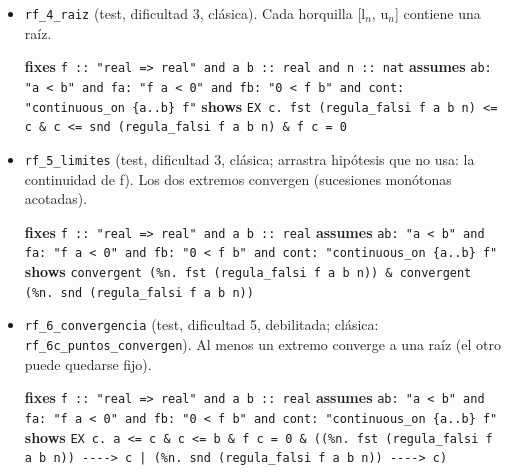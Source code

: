 \documentclass[11pt,a4paper]{article}
\begin{document}
\begin{itemize}
  \item \texttt{rf\_\allowbreak{}4\_\allowbreak{}raiz} (test, dificultad 3, clásica). Cada horquilla [l$_{n}$, u$_{n}$] contiene una raíz.\\
  {\footnotesize \textbf{fixes} \texttt{f :\allowbreak{}:\allowbreak{} "real =\allowbreak{}> real" and a b :\allowbreak{}:\allowbreak{} real and n :\allowbreak{}:\allowbreak{} nat} \textbf{assumes} \texttt{ab:\allowbreak{} "a < b" and fa:\allowbreak{} "f a < 0" and fb:\allowbreak{} "0 < f b" and cont:\allowbreak{} "continuous\_\allowbreak{}on \{a..b\} f"} \textbf{shows} \texttt{EX c. fst (\allowbreak{}regula\_\allowbreak{}falsi f a b n) <=\allowbreak{} c \&\allowbreak{} c <=\allowbreak{} snd (\allowbreak{}regula\_\allowbreak{}falsi f a b n) \&\allowbreak{} f c =\allowbreak{} 0}\par}
  \item \texttt{rf\_\allowbreak{}5\_\allowbreak{}limites} (test, dificultad 3, clásica; arrastra hipótesis que no usa: la continuidad de f). Los dos extremos convergen (sucesiones monótonas acotadas).\\
  {\footnotesize \textbf{fixes} \texttt{f :\allowbreak{}:\allowbreak{} "real =\allowbreak{}> real" and a b :\allowbreak{}:\allowbreak{} real} \textbf{assumes} \texttt{ab:\allowbreak{} "a < b" and fa:\allowbreak{} "f a < 0" and fb:\allowbreak{} "0 < f b" and cont:\allowbreak{} "continuous\_\allowbreak{}on \{a..b\} f"} \textbf{shows} \texttt{convergent (\allowbreak{}\%n. fst (\allowbreak{}regula\_\allowbreak{}falsi f a b n)) \&\allowbreak{} convergent (\allowbreak{}\%n. snd (\allowbreak{}regula\_\allowbreak{}falsi f a b n))}\par}
  \item \texttt{rf\_\allowbreak{}6\_\allowbreak{}convergencia} (test, dificultad 5, debilitada; clásica: \texttt{rf\_\allowbreak{}6c\_\allowbreak{}puntos\_\allowbreak{}convergen}). Al menos un extremo converge a una raíz (el otro puede quedarse fijo).\\
  {\footnotesize \textbf{fixes} \texttt{f :\allowbreak{}:\allowbreak{} "real =\allowbreak{}> real" and a b :\allowbreak{}:\allowbreak{} real} \textbf{assumes} \texttt{ab:\allowbreak{} "a < b" and fa:\allowbreak{} "f a < 0" and fb:\allowbreak{} "0 < f b" and cont:\allowbreak{} "continuous\_\allowbreak{}on \{a..b\} f"} \textbf{shows} \texttt{EX c. a <=\allowbreak{} c \&\allowbreak{} c <=\allowbreak{} b \&\allowbreak{} f c =\allowbreak{} 0 \&\allowbreak{} (\allowbreak{}(\allowbreak{}\%n. fst (\allowbreak{}regula\_\allowbreak{}falsi f a b n)) -\allowbreak{}{}-\allowbreak{}{}-\allowbreak{}{}-\allowbreak{}{}> c |\allowbreak{} (\allowbreak{}\%n. snd (\allowbreak{}regula\_\allowbreak{}falsi f a b n)) -\allowbreak{}{}-\allowbreak{}{}-\allowbreak{}{}-\allowbreak{}{}> c)}\par}

\end{itemize}
\end{document}
